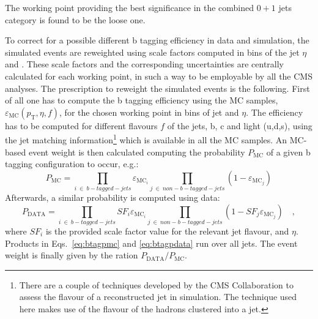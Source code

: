 The working point providing the best significance in the combined $0+1$ jets category is found to be the loose one.

To correct for a possible different b tagging efficiency in data and simulation, the simulated events are reweighted using scale factors computed in bins of the jet $\eta$ and \pt. These scale factors and the corresponding uncertainties are centrally calculated for each working point, in such a way to be employable by all the CMS analyses. The prescription to reweight the simulated events is the following. First of all one has to compute the b tagging efficiency using the MC samples, $\varepsilon_\mathrm{MC}(p_\mathrm{T}, \eta, f)$, for the chosen working point in bins of jet \pt and $\eta$. The efficiency has to be computed for different flavours $f$ of the jets, b, c and light (u,d,s), using the jet matching information\footnote{There are a couple of techniques developed by the CMS Collaboration to assess the flavour of a reconstructed jet in simulation. The technique used here makes use of the flavour of the hadrons clustered into a jet.} which is available in all the MC samples. An MC-based event weight is then calculated computing the probability $P_\mathrm{MC}$ of a given b tagging configuration to occur, e.g.:
\begin{equation}
P_\mathrm{MC}=\prod_{i~\in{}~b-tagged-jets}\varepsilon_{\mathrm{MC}_{i}}\prod_{j~\in{}~non-b-tagged-jets}(1-\varepsilon_{\mathrm{MC}_{j}})
\label{eq:btagpmc}
\end{equation}
Afterwards, a similar probability is computed using data:
\begin{equation}
P_\mathrm{DATA}=\prod_{i~\in{}~b-tagged-jets}SF_{i}\varepsilon_{\mathrm{MC}_{i}}\prod_{j~\in{}~non-b-tagged-jets}(1-SF_{j}\varepsilon_{\mathrm{MC}_{j}}) \quad ,
\label{eq:btagpdata}
\end{equation}
where $SF_{i}$ is the provided scale factor value for the relevant jet flavour, \pt and $\eta$. Products in Eqs.~\ref{eq:btagpmc} and \ref{eq:btagpdata} run over all jets. The event weight is finally given by the ration $P_\mathrm{DATA}/P_\mathrm{MC}$.

